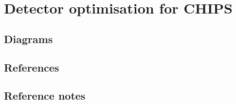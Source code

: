 \chapter{Detector optimisation for CHIPS}
\label{chap:optimisation}




\section{Diagrams}


\section{References}


\section{Reference notes}